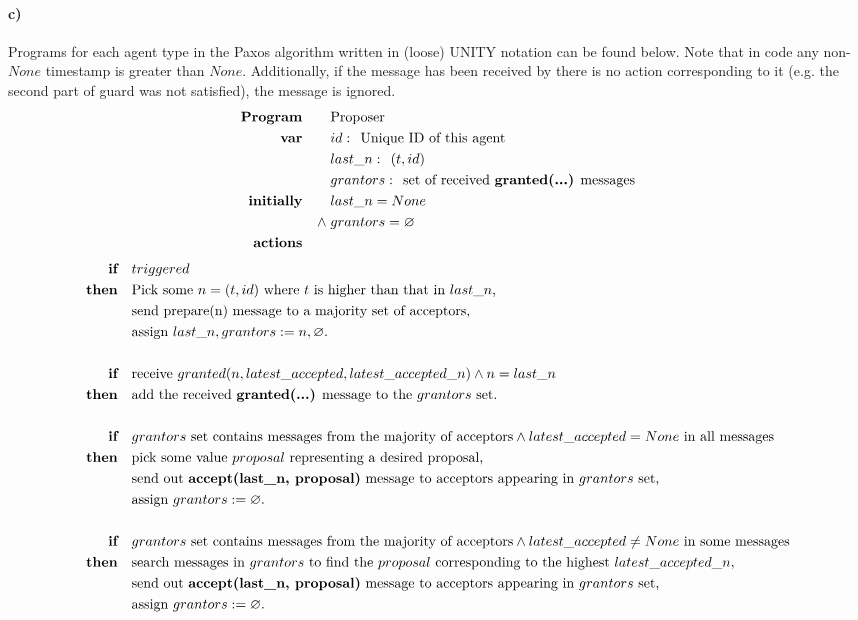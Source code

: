 \documentclass[10pt,letter]{article}
\begin{document}
\paragraph{c)} Programs for each agent type in the Paxos algorithm written in (loose) UNITY notation can be found below. Note that in code any non-$None$ timestamp is greater than $None$. Additionally, if the message has been received by there is no action corresponding to it (e.g. the second part of guard was not satisfied), the message is ignored.
\begin{align*}
\textrm{\textbf{Program}} \qquad & \textrm{Proposer}
\\
\textrm{\textbf{var}} \qquad & id\; \textrm{:\; Unique ID of this agent}
\\ & last\_n\; \textrm{:\; $(t, id)$}
\\ & grantors\; \textrm{:\; set of received \textbf{granted(...)} messages}
\\
\textrm{\textbf{initially}} \qquad & last\_n = None
\\
\land\; & grantors = \varnothing
\\
\textrm{\textbf{actions}} \qquad &
\end{align*}
\begin{align*}
\textbf{if}\quad &triggered
\\
\textbf{then}\quad &\textrm{Pick some $n = (t, id)$ where $t$ is higher than that in $last\_n$,}
\\ &\textrm{send prepare(n) message to a majority set of acceptors,}
\\ &\textrm{assign } last\_n, grantors := n, \varnothing.
\\\\
\textbf{if}\quad &\textrm{receive } granted(n, latest\_accepted, latest\_accepted\_n) \land n = last\_n
\\ \textbf{then}\quad &\textrm{add the received \textbf{granted(...)} message to the $grantors$ set.}
\\\\
\textbf{if}\quad &\textrm{$grantors$ set contains messages from the majority of acceptors} \land \textrm{$latest\_accepted = None$ in all messages}
\\ \textbf{then}\quad &\textrm{pick some value $proposal$ representing a desired proposal,}
\\ &\textrm{send out \textbf{accept(last\_n, proposal)} message to acceptors appearing in $grantors$ set,}
\\ &\textrm{assign } grantors := \varnothing.
\\\\
\textbf{if}\quad &\textrm{$grantors$ set contains messages from the majority of acceptors} \land \textrm{$latest\_accepted \neq None$ in some messages}
\\ \textbf{then}\quad &\textrm{search messages in $grantors$ to find the $proposal$ corresponding to the highest $latest\_accepted\_n$,}
\\ &\textrm{send out \textbf{accept(last\_n, proposal)} message to acceptors appearing in $grantors$ set,}
\\ &\textrm{assign } grantors := \varnothing.
\end{align*}
\end{document}
